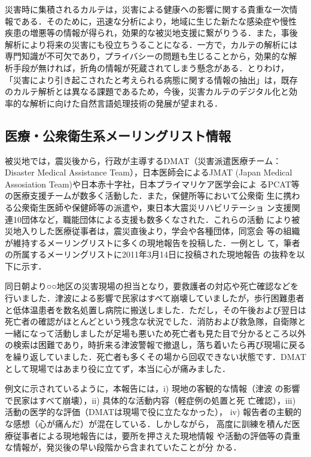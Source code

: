 \documentclass[japanese]{jnlp_1.4}
\begin{document}
災害時に集積されるカルテは，災害による健康への影響に関する貴重な一次情
報である．そのために，迅速な分析により，地域に生じた新たな感染症や慢性
疾患の増悪等の情報が得られ，効果的な被災地支援に繋がりうる．また，事後
解析により将来の災害にも役立ちうることになる．一方で，カルテの解析には
専門知識が不可欠であり，プライバシーの問題も生じることから，効果的な解
析手段が無ければ，折角の情報が死蔵されてしまう懸念がある．とりわけ，
「災害により引き起こされたと考えられる病態に関する情報の抽出」は，既存
のカルテ解析とは異なる課題であるため，今後，災害カルテのデジタル化と効
率的な解析に向けた自然言語処理技術の発展が望まれる．


\subsection{医療・公衆衛生系メーリングリスト情報}

被災地では，震災後から，行政が主導するDMAT（災害派遣医療チーム：
Disaster Medical Assistance Team），日本医師会によるJMAT (Japan
Medical Assosiation Team)や日本赤十字社，日本プライマリケア医学会によ
るPCAT等の医療支援チームが数多く活動した．また，保健所等において公衆衛
生に携わる公衆衛生医師や保健師等の派遣や，東日本大震災リハビリテーショ
ン支援関連10団体など，職能団体による支援も数多くなされた．これらの活動
により被災地入りした医療従事者は，震災直後より，学会や各種団体，同窓会
等の組織が維持するメーリングリストに多くの現地報告を投稿した．一例とし
て，筆者の所属するメーリングリストに2011年3月14日に投稿された現地報告
の抜粋を以下に示す．

\vspace{1\Cvs}
\begin{screen}
同日朝より○○地区の災害現場の担当となり，要救護者の対応や死亡確認などを行いました．津波による影響で民家はすべて崩壊していましたが，歩行困難患者と低体温患者を数名処置し病院に搬送しました．ただし，その午後および翌日は死亡者の確認がほとんどという残念な状況でした．消防および救急隊，自衛隊と一緒になって活動しましたが足場も悪いため死亡者も見た目で分かるところ以外の検索は困難であり，時折来る津波警報で撤退し，落ち着いたら再び現場に戻るを繰り返していました．死亡者も多くその場から回収できない状態です．DMAT として現場ではあまり役に立てず，本当に心が痛みました．
\end{screen}

\vspace{1\Cvs}
例文に示されているように，本報告には，i) 現地の客観的な情報（津波
の影響で民家はすべて崩壊），ii) 具体的な活動内容（軽症例の処置と死
亡確認），iii) 活動の医学的な評価（DMATは現場で役に立たなかった），
iv) 報告者の主観的な感想（心が痛んだ）が混在している．しかしながら，
高度に訓練を積んだ医療従事者による現地報告には，要所を押さえた現地情報
や活動の評価等の貴重な情報が，発災後の早い段階から含まれていたことが分
かる．
\end{document}
